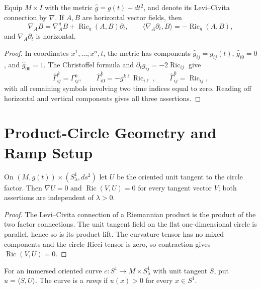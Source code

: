 \begin{lemma}
\label{lem:space-time-metric-connection}
\notready
Equip $M\times I$ with the metric $\widehat g=g(t)+dt^2$, and denote its
Levi--Civita connection by $\nabla$.  If $A,B$ are horizontal vector fields,
then
\[
 \nabla_A B=\nabla_A^gB+\operatorname{Ric}_g(A,B)\partial_t,
 \qquad
 \langle\nabla_A\partial_t,B\rangle
       =-\operatorname{Ric}_g(A,B),
\]
and $\nabla_A\partial_t$ is horizontal.
\end{lemma}
\begin{proof}
In coordinates $x^1,\ldots,x^n,t$, the metric has components
$\widehat g_{ij}=g_{ij}(t)$, $\widehat g_{i0}=0$, and
$\widehat g_{00}=1$.  The Christoffel formula and
$\partial_tg_{ij}=-2\operatorname{Ric}_{ij}$ give
\[
 \widehat\Gamma^k_{ij}=\Gamma^k_{ij},\qquad
 \widehat\Gamma^k_{i0}=-g^{k\ell}\operatorname{Ric}_{i\ell},
 \qquad
 \widehat\Gamma^0_{ij}=\operatorname{Ric}_{ij},
\]
with all remaining symbols involving two time indices equal to zero.  Reading
off horizontal and vertical components gives all three assertions.
\end{proof}

\section{Product-Circle Geometry and Ramp Setup}

\begin{theorem}
\label{lem:product-circle-parallel-geometry}
\notready
On $(M,g(t))\times(S^1_\lambda,ds^2)$ let $U$ be the oriented unit tangent
to the circle factor.  Then $\nabla U=0$ and
$\operatorname{Ric}(V,U)=0$ for every tangent vector $V$; both assertions are
independent of $\lambda>0$.
\end{theorem}
\begin{proof}
The Levi--Civita connection of a Riemannian product is the product of the two
factor connections.  The unit tangent field on the flat one-dimensional
circle is parallel, hence so is its product lift.  The curvature tensor has no
mixed components and the circle Ricci tensor is zero, so contraction gives
$\operatorname{Ric}(V,U)=0$.
\end{proof}

\begin{definition}[Ramp]
\label{def:ramp-curve}
\notready
For an immersed oriented curve $c\colon S^1\to M\times S^1_\lambda$ with
unit tangent $S$, put $u=\langle S,U\rangle$.  The curve is a \emph{ramp} if
$u(x)>0$ for every $x\in S^1$.
\end{definition}

